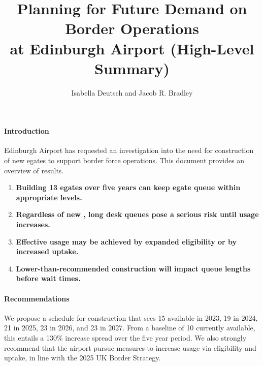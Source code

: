 \documentclass[10pt]{article}
\title{Planning for Future Demand on Border Operations\\ at Edinburgh Airport (High-Level Summary)}
\author{Isabella Deutsch and Jacob R. Bradley}
\date{}
\begin{document}
\maketitle
\thispagestyle{empty}

\vspace{-15pt}
\paragraph{Introduction}
Edinburgh Airport has requested an investigation into the need for construction of new \glspl{egate} to support border force operations. This document provides an overview of results.
\begin{tcolorbox}[
colframe=edi-dark-purple,
colback=edi-light-purple,
fonttitle=\bfseries,
title = {Report Highlights}]
\begin{enumerate}[itemsep=-1ex]
   \vspace{-1.5mm}
    \item[\ding{40}] \textbf{Building 13 \glspl{egate} over five years can keep \gls{egate} queue  within appropriate levels.}\\
    \vspace{-1.5mm}
    \item[\ding{40}] \textbf{Regardless of new , long desk queues pose a serious risk until  usage increases.}\\
    \vspace{-1.5mm}
    \item[\ding{40}] \textbf{Effective  usage may be achieved by expanded eligibility or by increased uptake.}\\
    \vspace{-1.5mm}
    \item[\ding{40}] \textbf{Lower-than-recommended  construction will impact queue lengths before wait times.}
    \vspace{-1.5mm}
\end{enumerate}
\end{tcolorbox}
\paragraph{Recommendations}
We propose a schedule for  construction that sees 15  available in 2023, 19 in 2024, 21 in 2025, 23 in 2026, and 23 in 2027. From a baseline of 10  currently available, this entails a 130\% increase spread over the five year period. We also strongly recommend that the airport pursue measures to increase  usage via eligibility and uptake, in line with the 2025 UK Border Strategy. 
\end{document}
